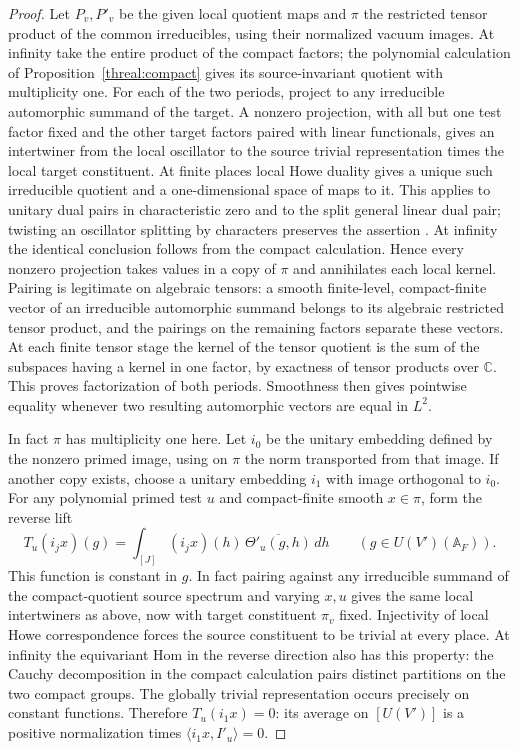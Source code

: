 \begin{proof}
Let \(P_v,P'_v\) be the given local quotient maps and \(\pi\)
the restricted tensor product of the common irreducibles, using
their normalized vacuum images. At infinity take the entire
product of the compact factors; the polynomial calculation of
Proposition~\ref{threal:compact} gives its source-invariant
quotient with multiplicity one. For each of the two periods,
project to any irreducible automorphic summand of the target.
A nonzero projection, with all but one test factor fixed and
the other target factors paired with linear functionals, gives
an intertwiner from the local oscillator to the source trivial
representation times the local target constituent. At finite
places local Howe duality gives a unique such irreducible quotient
and a one-dimensional space of maps to it. This applies to
unitary dual pairs in characteristic zero and to the split
general linear dual pair; twisting an oscillator splitting by
characters preserves the assertion
\cite{ganTakedaHowe,minguezHowe}. At infinity the identical
conclusion follows from the compact calculation. Hence every
nonzero projection takes values in a copy of \(\pi\) and
annihilates each local kernel. Pairing is legitimate on algebraic
tensors: a smooth finite-level, compact-finite vector of an
irreducible automorphic summand belongs to its algebraic restricted
tensor product, and the pairings on the remaining factors separate
these vectors. At each finite tensor stage the kernel of the tensor
quotient is the sum of the subspaces having a kernel in one
factor, by exactness of tensor products over \(\mathbb C\).
This proves factorization of both periods. Smoothness then gives
pointwise equality whenever two resulting automorphic vectors are
equal in \(L^2\).

In fact \(\pi\) has multiplicity one here. Let \(i_0\) be the
unitary embedding defined by the nonzero primed image, using on
\(\pi\) the norm transported from that image. If another copy
exists, choose a unitary embedding \(i_1\) with image orthogonal
to \(i_0\). For any polynomial primed test \(u\) and compact-finite
smooth \(x\in\pi\), form the reverse lift
\[
  T_u(i_jx)(g)=\int_{[J]}(i_jx)(h)\,
                \overline{\Theta'_u(g,h)}\,dh
         \qquad (g\in U(V')(\mathbb A_F)).
\]
This function is constant in \(g\). In fact pairing against any
irreducible summand of the compact-quotient source spectrum and
varying \(x,u\) gives the same local intertwiners as above,
now with target constituent \(\pi_v\) fixed. Injectivity of
local Howe correspondence forces the source constituent to
be trivial at every place. At infinity the equivariant Hom in
the reverse direction also has this property: the Cauchy
decomposition in the compact calculation pairs distinct partitions
on the two compact groups. The globally trivial representation
occurs precisely on constant functions. Therefore \(T_u(i_1x)=0\):
its average on \([U(V')]\) is a positive normalization times
\(\langle i_1x,I'_u\rangle=0\).


\end{proof}
